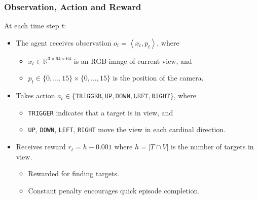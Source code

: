 \begin{frame}
    \frametitle{Observation, Action and Reward}

    At each time step \(t\):

    \begin{itemize}
        \item The agent receives observation \(o_t = \left\langle x_t, p_t \right\rangle\), where
        \begin{itemize}
            \item \(x_t \in \mathbb{R}^{3 \times 64 \times 64}\) is an RGB image of current view, and
            \item \(p_t \in \{0, \dots, 15\} \times \{0, \dots, 15\}\) is the position of the camera.
        \end{itemize}
        \item Takes action \(a_t \in \{\texttt{TRIGGER}, \texttt{UP}, \texttt{DOWN}, \texttt{LEFT}, \texttt{RIGHT}\}\), where
        \begin{itemize}
            \item \texttt{TRIGGER} indicates that a target is in view, and
            \item \texttt{UP}, \texttt{DOWN}, \texttt{LEFT}, \texttt{RIGHT} move the view in each cardinal direction.
        \end{itemize}
        \item Receives reward \(r_t = h - 0.001\) where \(h = \left\vert T \cap V \right\vert\) is the number of targets in view.
        \begin{itemize}
            \item Rewarded for finding targets.
            \item Constant penalty encourages quick episode completion.
        \end{itemize}
    \end{itemize}
\end{frame}

